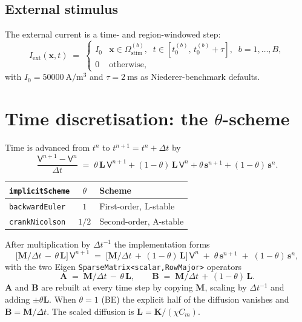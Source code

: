 \documentclass[11pt,a4paper]{article}
\newcommand{\code}[1]{\texttt{\small #1}}
\newcommand{\Mmass}{\mathbf{M}}
\newcommand{\Kstif}{\mathbf{K}}
\newcommand{\Lop}{\mathbf{L}}
\newcommand{\Aimp}{\mathbf{A}}
\newcommand{\Bimp}{\mathbf{B}}
\newcommand{\Iext}{I_{\mathrm{ext}}}
\begin{document}
\subsection{External stimulus}

The external current is a time- and region-windowed step:
\begin{equation}
  \Iext(\mathbf{x}, t) \;=\;
  \begin{cases}
    I_{0} & \mathbf{x} \in \Omega_{\text{stim}}^{(b)},
            \;\; t \in [t_{0}^{(b)},\, t_{0}^{(b)} + \tau],
            \;\; b = 1, \dots, B, \\
    0     & \text{otherwise},
  \end{cases}
\end{equation}
with $I_{0} = \SI{50000}{\ampere\per\meter\cubed}$ and
$\tau = \SI{2}{\milli\second}$ as Niederer-benchmark defaults.

\section{Time discretisation: the $\theta$-scheme}

Time is advanced from $t^{n}$ to $t^{n+1} = t^{n} + \Delta t$ by
\begin{equation}
  \frac{\mathsf{V}^{n+1} - \mathsf{V}^{n}}{\Delta t}
   \;=\;
   \theta\, \Lop\, \mathsf{V}^{n+1}
   + (1-\theta)\, \Lop\, \mathsf{V}^{n}
   + \theta\, \mathbf{s}^{n+1}
   + (1-\theta)\, \mathbf{s}^{n}.
   \label{eq:theta}
\end{equation}

\begin{center}
\begin{tabular}{@{}lcl@{}}
\toprule
\code{implicitScheme} & $\theta$ & Scheme \\
\midrule
\code{backwardEuler} & $1$   & First-order, L-stable \\
\code{crankNicolson} & $1/2$ & Second-order, A-stable \\
\bottomrule
\end{tabular}
\end{center}

After multiplication by $\Delta t^{-1}$ the implementation forms
\begin{equation}
  \bigl[\Mmass/\Delta t \,-\, \theta\, \Lop\bigr]\, \mathsf{V}^{n+1}
   \;=\;
   \bigl[\Mmass/\Delta t \,+\, (1-\theta)\, \Lop\bigr]\, \mathsf{V}^{n}
   \;+\; \theta\, \mathbf{s}^{n+1}
   \;+\; (1-\theta)\, \mathbf{s}^{n},
   \label{eq:implicit-system}
\end{equation}
with the two Eigen \code{SparseMatrix<scalar,RowMajor>} operators
\begin{equation}
  \Aimp \;=\; \Mmass/\Delta t \,-\, \theta\, \Lop,
   \qquad
  \Bimp \;=\; \Mmass/\Delta t \,+\, (1-\theta)\, \Lop.
   \label{eq:AB}
\end{equation}
$\Aimp$ and $\Bimp$ are rebuilt at every time step by copying $\Mmass$,
scaling by $\Delta t^{-1}$ and adding $\pm \theta \Lop$. When
$\theta = 1$ (BE) the explicit half of the diffusion vanishes and
$\Bimp = \Mmass/\Delta t$. The scaled diffusion is
$\Lop = \Kstif / (\chi C_{m})$.
\end{document}
